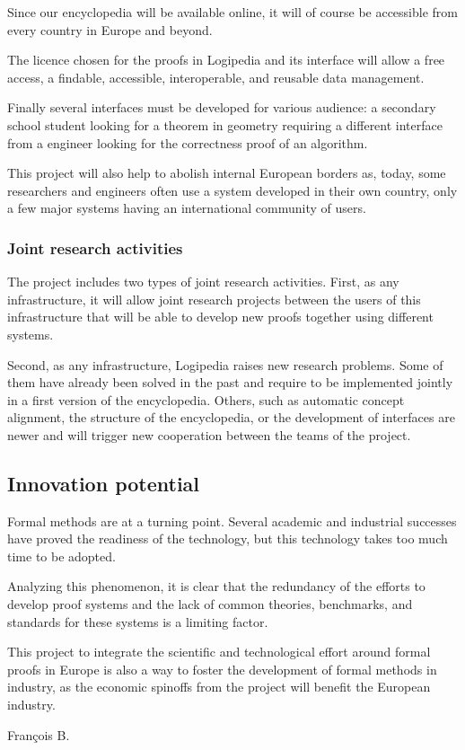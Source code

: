 Since our encyclopedia will be available online, it will of course be
accessible from every country in Europe and beyond.

The licence chosen for the proofs in {\sf Logipedia} and its interface
will allow a free access, a findable, accessible, interoperable, and
reusable data management.

Finally several interfaces must be developed for various audience: a
secondary school student looking for a theorem in geometry requiring a
different interface from a engineer looking for the correctness proof
of an algorithm.

This project will also help to abolish internal European borders as,
today, some researchers and engineers often use a system developed in
their own country, only a few major systems having an international
community of users.

\subsubsection{Joint research activities}

The project includes two types of joint research activities.  First,
as any infrastructure, it will allow joint research projects
between the users of this infrastructure that will be able to develop
new proofs together using different systems.

Second, as any infrastructure, {\sf Logipedia} raises new research
problems. Some of them have already been solved in the past and
require to be implemented jointly in a first version of the
encyclopedia. Others, such as automatic concept alignment, the
structure of the encyclopedia, or the development of interfaces are
newer and will trigger new cooperation between the teams of the
project.

\subsection{Innovation potential}

Formal methods are at a turning point. Several academic and
industrial successes have proved the readiness of the technology, but
this technology takes too much time to be adopted.

Analyzing this phenomenon, it is clear that the redundancy of the
efforts to develop proof systems and the lack of common theories,
benchmarks, and standards for these systems is a limiting factor.

This project to integrate the scientific and technological effort
around formal proofs in Europe is also a way to foster the
development of formal methods in industry, as the economic spinoffs
from the project will benefit the European industry.

{\color{red}
François B.}


